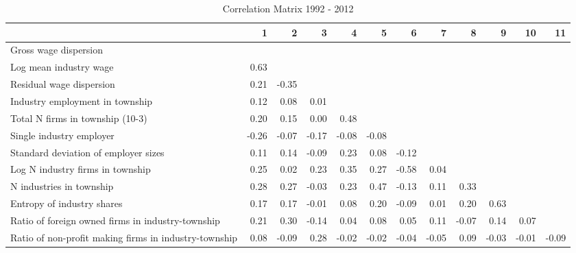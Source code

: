 \begin{table}[htb]
\centering
\caption{Correlation Matrix 1992 - 2012} 
\begin{tabular}{lrrrrrrrrrrr}
  \hline
 & 1 & 2 & 3 & 4 & 5 & 6 & 7 & 8 & 9 & 10 & 11 \\ 
  \hline
Gross wage dispersion &  &  &  &  &  &  &  &  &  &  &  \\ 
  Log mean industry wage & 0.63 &  &  &  &  &  &  &  &  &  &  \\ 
  Residual wage dispersion & 0.21 & -0.35 &  &  &  &  &  &  &  &  &  \\ 
  Industry employment in township & 0.12 & 0.08 & 0.01 &  &  &  &  &  &  &  &  \\ 
  Total N firms in township (10-3) & 0.20 & 0.15 & 0.00 & 0.48 &  &  &  &  &  &  &  \\ 
  Single industry employer & -0.26 & -0.07 & -0.17 & -0.08 & -0.08 &  &  &  &  &  &  \\ 
  Standard deviation of employer sizes & 0.11 & 0.14 & -0.09 & 0.23 & 0.08 & -0.12 &  &  &  &  &  \\ 
  Log N industry firms in township & 0.25 & 0.02 & 0.23 & 0.35 & 0.27 & -0.58 & 0.04 &  &  &  &  \\ 
  N industries in township & 0.28 & 0.27 & -0.03 & 0.23 & 0.47 & -0.13 & 0.11 & 0.33 &  &  &  \\ 
  Entropy of industry shares & 0.17 & 0.17 & -0.01 & 0.08 & 0.20 & -0.09 & 0.01 & 0.20 & 0.63 &  &  \\ 
  Ratio of foreign owned firms in industry-township & 0.21 & 0.30 & -0.14 & 0.04 & 0.08 & 0.05 & 0.11 & -0.07 & 0.14 & 0.07 &  \\ 
  Ratio of non-profit making firms in industry-township & 0.08 & -0.09 & 0.28 & -0.02 & -0.02 & -0.04 & -0.05 & 0.09 & -0.03 & -0.01 & -0.09 \\ 
   \hline
\end{tabular}
\end{table}

